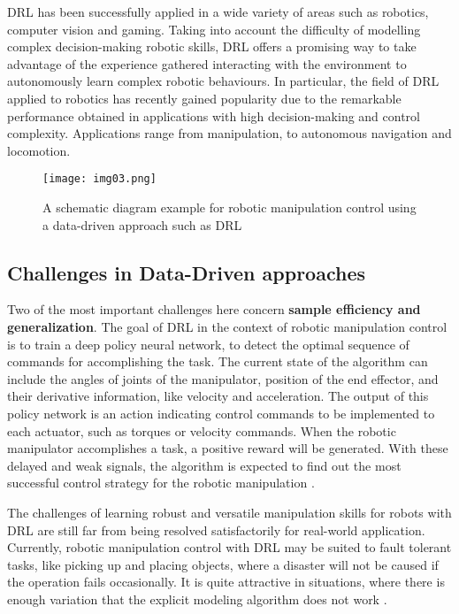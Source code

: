 DRL has been successfully applied in a wide variety of areas such as robotics, computer vision and gaming.
Taking into account the difficulty of modelling complex decision-making robotic skills, DRL offers
a promising way to take advantage of the experience gathered interacting with the environment to
autonomously learn complex robotic behaviours. In particular, the field of DRL applied to robotics has
recently gained popularity due to the remarkable performance obtained in applications with high decision-making
and control complexity. Applications range from manipulation, to autonomous navigation and locomotion.
\cite{iriondo2023learning}

\begin{figure}[h]
	\centering
	\texttt{[image: img03.png]}
	\captionsetup{width=0.8\linewidth}
	\caption{A schematic diagram example for robotic manipulation control
		using a data-driven approach such as DRL \cite{liu2021deep}}
	\label{fig:img03}
\end{figure}


\subsection{Challenges in Data-Driven approaches}

Two of the most important challenges here concern \textbf{sample efficiency and generalization}.
The goal of DRL in the context of robotic manipulation
control is to train a deep policy neural network, to detect the optimal
sequence of commands for accomplishing the task. The current state of the algorithm can include
the angles of joints of the manipulator, position of the end effector, and their derivative information,
like velocity and acceleration. The output of this policy network is an action indicating control
commands to be implemented to each actuator, such as torques or velocity commands. When the robotic manipulator
accomplishes a task, a positive reward will be generated. With these delayed and weak
signals, the algorithm is expected to find out the most successful control strategy for the
robotic manipulation \cite{liu2021deep}.

The challenges of learning robust and versatile manipulation skills
for robots with DRL are still far from being resolved satisfactorily for real-world application.
Currently, robotic manipulation control with DRL may be suited to fault tolerant
tasks, like picking up and placing objects, where a disaster will not be caused if the
operation fails occasionally. It is quite attractive in situations, where there is enough
variation that the explicit modeling algorithm does not work \cite{liu2021deep}.

